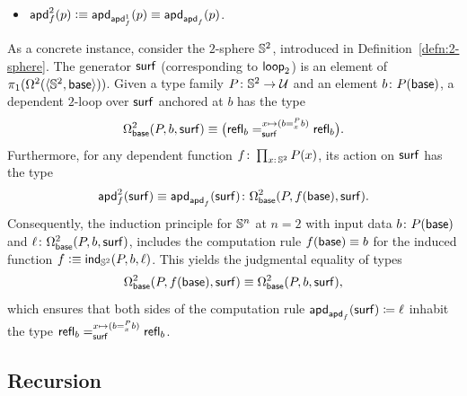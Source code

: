 \begin{xmpl}
\begin{itemize}
        \item $\mathsf{apd}^2_f(p)\mathrel{\vcentcolon}\equiv\mathsf{apd}_{\mathsf{apd}^1_f}(p)\equiv\mathsf{apd}_{\mathsf{apd}_f}(p)$.
    \end{itemize}
    As a concrete instance, consider the $2$-sphere $\mathbb S^2$, introduced in Definition~\ref{defn:2-sphere}. The generator $\mathsf{surf}$ (corresponding to $\mathsf{loop}_2$) is an element of $\pi_1(\Omega^2(\langle\mathbb S^2,\mathsf{base}\rangle))$. Given a type family $P\colon\sphere^2\to\univ$ and an element $b\colon P(\fun{base})$, a dependent $2$-loop over $\mathsf{surf}$ anchored at $b$ has the type
    \[
        \Omega^2_{\mathsf{base}}(P,b,\mathsf{surf})\equiv\bigl(\mathsf{refl}_b=_{\mathsf{surf}}^{x\mapsto(b=_{x}^{P}b)}\mathsf{refl}_b\bigr).
    \]
    Furthermore, for any dependent function $f\colon\prod_{x\colon\sphere^2}P(x)$, its action on $\mathsf{surf}$ has the type
    \[
        \fun{apd}^2_f(\fun{surf})\equiv\fun{apd}_{\fun{apd}_f}(\fun{surf})\colon\Omega^2_{\fun{base}}(P,f(\fun{base}),\fun{surf}).
    \]
    Consequently, the induction principle for $\mathbb S^n$ at $n=2$ with input data $b\colon P(\fun{base})$ and $\ell\colon\Omega^2_{\fun{base}}(P,b,\fun{surf})$, includes the computation rule $f(\mathsf{base})\equiv b$ for the induced function $f\mathrel{\vcentcolon}\equiv\mathsf{ind}_{\mathbb S^2}(P,b,\ell)$. This yields the judgmental equality of types
    \[
        \Omega^2_{\mathsf{base}}(P,f(\mathsf{base}),\mathsf{surf})
            \equiv\Omega^2_{\mathsf{base}}(P,b,\mathsf{surf}),
    \]
    which ensures that both sides of the computation rule $\mathsf{apd}_{\mathsf{apd}_f}(\mathsf{surf})\coloneqq\ell$ inhabit the type $\mathsf{refl}_b=_{\mathsf{surf}}^{x\mapsto(b=_{x}^{P}b)}\mathsf{refl}_b$.
\end{xmpl}

\subsection{Recursion}

